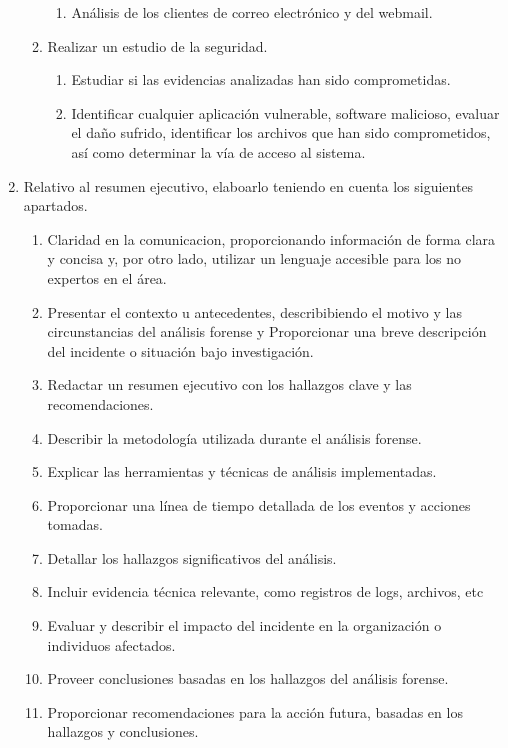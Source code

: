 \begin{enumerate}
\begin{enumerate}
\begin{enumerate}
            \item Análisis de los clientes de correo electrónico y del webmail.
        \end{enumerate}
        \item Realizar un estudio de la seguridad.
            \begin{enumerate}
                \item Estudiar si las evidencias analizadas han sido comprometidas.
                \item Identificar cualquier aplicación vulnerable, software malicioso, evaluar el daño sufrido, identificar los archivos que han sido comprometidos, así como determinar la vía de acceso al sistema.
            \end{enumerate}
        \end{enumerate}
    \item Relativo al resumen ejecutivo, elaboarlo teniendo en cuenta los siguientes apartados.
    \begin{enumerate}
        \item Claridad en la comunicacion, proporcionando información de forma clara y concisa y, por otro lado, utilizar un lenguaje accesible para los no expertos en el área.
        \item Presentar el contexto u antecedentes, describibiendo el motivo y las circunstancias del análisis forense y Proporcionar una breve descripción del incidente o situación bajo investigación.
        \item Redactar un resumen ejecutivo con los hallazgos clave y las recomendaciones.
        \item Describir la metodología utilizada durante el análisis forense.
        \item Explicar las herramientas y técnicas de análisis implementadas.
        \item Proporcionar una línea de tiempo detallada de los eventos y acciones tomadas.
        \item Detallar los hallazgos significativos del análisis.
        \item Incluir evidencia técnica relevante, como registros de logs, archivos, etc
        \item Evaluar y describir el impacto del incidente en la organización o individuos afectados.
        \item Proveer conclusiones basadas en los hallazgos del análisis forense.
        \item Proporcionar recomendaciones para la acción futura, basadas en los hallazgos y conclusiones.

\end{enumerate}
\end{enumerate}
